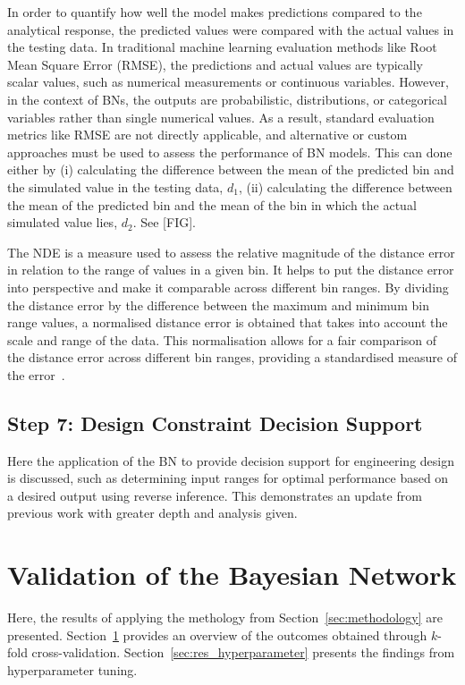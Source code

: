 \documentclass[journal]{IEEEtran}
\begin{document}
In order to quantify how well the model makes predictions compared to the analytical response, the predicted values were compared with the actual values in the testing data. In traditional machine learning evaluation methods like Root Mean Square Error (RMSE), the predictions and actual values are typically scalar values, such as numerical measurements or continuous variables. However, in the context of BNs, the outputs are probabilistic, distributions, or categorical variables rather than single numerical values. As a result, standard evaluation metrics like RMSE are not directly applicable, and alternative or custom approaches must be used to assess the performance of BN models. This can done either by (i) calculating the difference between the mean of the predicted bin and the simulated value in the testing data, $d_{1}$, (ii) calculating the difference between the mean of the predicted bin and the mean of the bin in which the actual simulated value lies, $d_{2}$. See [FIG].

The NDE is a measure used to assess the relative magnitude of the distance error in relation to the range of values in a given bin. It helps to put the distance error into perspective and make it comparable across different bin ranges. By dividing the distance error by the difference between the maximum and minimum bin range values, a normalised distance error is obtained that takes into account the scale and range of the data. This normalisation allows for a fair comparison of the distance error across different bin ranges, providing a standardised measure of the error~\cite{Conti2019}.

\subsection{\textbf{Step 7}: Design Constraint Decision Support}\label{sec:meth_decision}

Here the application of the BN to provide decision support for engineering design is discussed, such as determining input ranges for optimal performance based on a desired output using reverse inference. This demonstrates an update from previous work with greater depth and analysis given. 

\section{Validation of the Bayesian Network}\label{sec:res_validation}
Here, the results of applying the methology from Section~\ref{sec:methodology} are presented. Section~\ref{sec:res_validation} provides an overview of the outcomes obtained through $k$-fold cross-validation. Section~\ref{sec:res_hyperparameter} presents the findings from hyperparameter tuning. 
\end{document}
